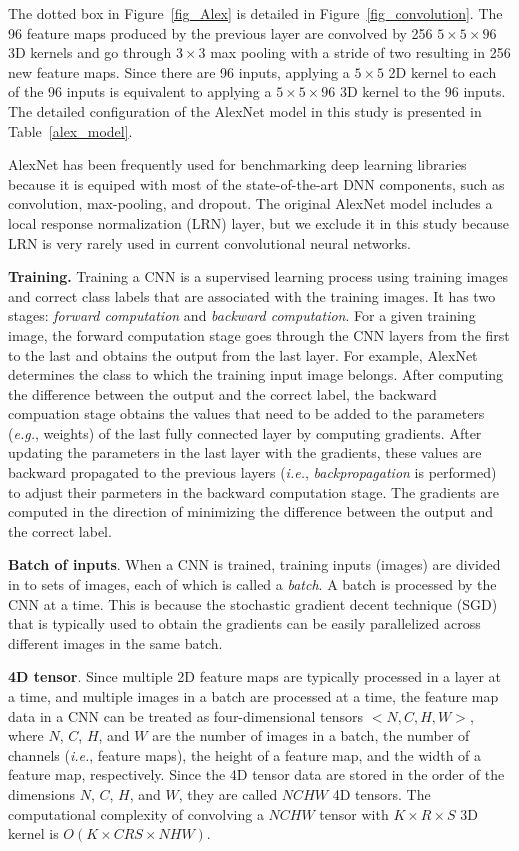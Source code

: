 The dotted box in Figure~\ref{fig_Alex} is detailed in Figure~\ref{fig_convolution}. The 96 feature maps produced by the previous layer are convolved by 256 $5 \times 5 \times 96$ 3D kernels and go through $3 \times 3$ max pooling with a stride of two resulting in 256 new feature maps. Since there are 96 inputs, applying a $5 \times 5$ 2D kernel to each of the 96 inputs is equivalent to applying a $5 \times 5 \times 96$ 3D kernel to the 96 inputs. The detailed configuration of the AlexNet model in this study is presented in Table~\ref{alex_model}.

AlexNet has been frequently used for benchmarking deep learning libraries because it is equiped with most of the state-of-the-art DNN components, such as convolution, max-pooling, and dropout\cite{convnet-benchmarks}. The original AlexNet model includes a local response normalization (LRN) layer, but we exclude it in this study because LRN is very rarely used in current convolutional neural networks. 

{\bf Training.} Training a CNN is a supervised learning process using training images and correct class labels that are associated with the training images. It has two stages: \textit{forward computation} and \textit{backward computation}. For a given training image, the forward computation stage goes through the CNN layers from the first to the last and obtains the output from the last layer. For example, AlexNet determines the class to which the training input image belongs. After computing the difference between the output and the correct label, the backward compuation stage obtains the values that need to be added to the parameters (\textit{e.g.}, weights) of the last fully connected layer by computing gradients. After updating the parameters in the last layer with the gradients, these values are backward propagated to the previous layers (\textit{i.e.}, \textit{backpropagation} is performed) to adjust their parmeters in the backward computation stage. The gradients are computed in the direction of minimizing the difference between the output and the correct label.

{\bf Batch of inputs}. When a CNN is trained, training inputs (images) are divided in to sets of images, each of which is called a \textit{batch}. A batch is processed by the CNN at a time. This is because the stochastic gradient decent technique (SGD)\cite{onlinesgd} that is typically used to obtain the gradients can be easily parallelized across different images in the same batch. 

{\bf 4D tensor}. Since multiple 2D feature maps are typically processed in a layer at a time, and multiple images in a batch are processed at a time, the feature map data in a CNN can be treated as four-dimensional tensors $<N, C, H, W>$, where $N$, $C$, $H$, and $W$ are the number of images in a batch, the number of channels (\textit{i.e.}, feature maps), the height of a feature map, and the width of a feature map, respectively. Since the 4D tensor data are stored in the order of the dimensions $N$, $C$, $H$, and $W$, they are called $NCHW$ 4D tensors. The computational complexity of convolving a $NCHW$ tensor with $K \times R \times S$ 3D kernel is $O(K \times CRS \times NHW)$.

